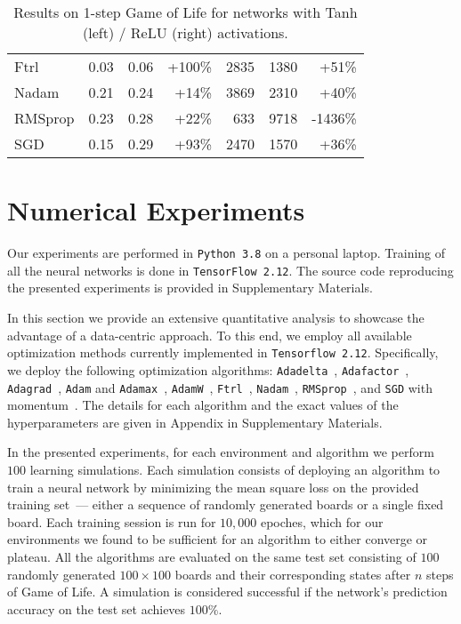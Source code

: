 \documentclass[letterpaper]{article} %
\begin{document}
\begin{table*}[t]
\begin{tabular}{lrrrrrr}
        \\
        Ftrl & 0.03 & 0.06 & +100\% & 2835 & 1380 & +51\%
        \\
        Nadam & 0.21 & 0.24 & +14\% & 3869 & 2310 & +40\%
        \\
        RMSprop & 0.23 & 0.28 & +22\% & 633 & 9718 & -1436\%
        \\
        SGD & 0.15 & 0.29 & +93\% & 2470 & 1570 & +36\%
        \\\bottomrule
    \end{tabular}
    \caption{Results on 1-step Game of Life for networks with Tanh (left) / ReLU (right) activations.}
    \label{tab:1_step}
\end{table*}



\section{Numerical Experiments}\label{sec:numerics}
Our experiments are performed in \texttt{Python~3.8} on a personal laptop.
Training of all the neural networks is done in \texttt{TensorFlow~2.12}.
The source code reproducing the presented experiments is provided in Supplementary Materials.

In this section we provide an extensive quantitative analysis to showcase the advantage of a data-centric approach.
To this end, we employ all available optimization methods currently implemented in \texttt{Tensorflow~2.12}.
Specifically, we deploy the following optimization algorithms: \texttt{Adadelta}~\cite{zeiler2012adadelta}, \texttt{Adafactor}~\cite{shazeer2018adafactor}, \texttt{Adagrad}~\cite{duchi2011adaptive}, \texttt{Adam} and \texttt{Adamax}~\cite{kingma2014adam}, \texttt{AdamW}~\cite{loshchilov2017decoupled}, \texttt{Ftrl}~\cite{mcmahan2013ad}, \texttt{Nadam}~\cite{dozat2016incorporating}, \texttt{RMSprop}~\cite{hinton2012neural}, and \texttt{SGD} with momentum~\cite{sutskever2013importance}.
The details for each algorithm and the exact values of the hyperparameters are given in Appendix in Supplementary Materials.

In the presented experiments, for each environment and algorithm we perform $100$ learning simulations.
Each simulation consists of deploying an algorithm to train a neural network by minimizing the mean square loss on the provided training set~--- either a sequence of randomly generated boards or a single fixed board.
Each training session is run for $10,000$ epoches, which for our environments we found to be sufficient for an algorithm to either converge or plateau.
All the algorithms are evaluated on the same test set consisting of $100$ randomly generated $100 \times 100$ boards and their corresponding states after $n$ steps of Game of Life.
A simulation is considered successful if the network's prediction accuracy on the test set achieves $100\%$.
\end{document}
